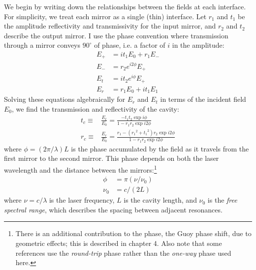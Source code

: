 We begin by writing down the relationships between the fields at each
interface.  For simplicity, we treat each mirror as a single (thin)
interface.  Let $r_1$ and $t_1$ be the amplitude reflectivity and
transmissivity for the input mirror, and $r_2$ and $t_2$ describe the
output mirror.  I use the phase convention where transmission through
a mirror conveys $90^\circ$ of phase, i.e. a factor of $i$ in the
amplitude:
%
\begin{align}
E_+ &= i t_1 E_0 + r_1 E_- \\
E_- &= r_2 e^{i 2 \phi} E_+ \\
E_t &= i t_2 e^{i \phi} E_+ \\
E_r &= r_1 E_0 + i t_1 E_1
\end{align}
%
Solving these equations algebraically for $E_r$ and $E_t$ in terms of the incident field $E_0$, we find the transmission and reflectivity of the cavity:
%
\begin{align}
t_c \equiv & \frac{E_t}{E_0} = 
         \frac{-t_1 t_2 \exp i\phi}
              {1 - r_1 r_2 \exp i2\phi} \\
r_c \equiv & \frac{E_r}{E_0} = 
         \frac{r_1 - \left({r_1}^2 + {t_1}^2\right)r_2 \exp{i2\phi}}
              {1 - r_1 r_2 \exp i2\phi}
\label{eq:cavity-reflectivity}
\end{align}
%
where $\phi=(2\pi/\lambda)L$ is the phase accumulated by the field as it travels from
the first mirror to the second mirror.  This phase depends on both the
laser wavelength and the distance between the mirrors:\footnote{There is an additional contribution to the phase, the Guoy phase shift, due to geometric effects; this is described in chapter 4.  Also note that some references use the \emph{round-trip} phase rather than the \emph{one-way} phase used here.}
\begin{align}
\phi  & = \pi (\nu / \nu_0) \\
\nu_0 & = c/(2L)
\end{align}
where $\nu=c/\lambda$ is the laser frequency, $L$ is the cavity
length, and $\nu_0$ is the \emph{free spectral range}, which describes
the spacing between adjacent resonances.


